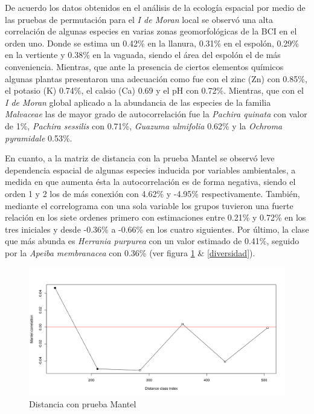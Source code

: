\documentclass[11pt,]{article}
\begin{document}
De acuerdo los datos obtenidos en el análisis de la ecología espacial
por medio de las pruebas de permutación para el \emph{I de Moran} local
se observó una alta correlación de algunas especies en varias zonas
geomorfológicas de la BCI en el orden uno. Donde se estima un 0.42\% en
la llanura, 0.31\% en el espolón, 0.29\% en la vertiente y 0.38\% en la
vaguada, siendo el área del espolón el de más conveniencia. Mientras,
que ante la presencia de ciertos elementos químicos algunas plantas
presentaron una adecuación como fue con el zinc (Zn) con 0.85\%, el
potasio (K) 0.74\%, el calsio (Ca) 0.69 y el pH con 0.72\%. Mientras,
que con el \emph{I de Moran} global aplicado a la abundancia de las
especies de la familia \emph{Malvaceae} las de mayor grado de
autocorrelación fue la \emph{Pachira quinata} con valor de 1\%,
\emph{Pachira sessilis} con 0.71\%, \emph{Guazuma ulmifolia} 0.62\% y la
\emph{Ochroma pyramidale} 0.53\%.

En cuanto, a la matriz de distancia con la prueba Mantel se observó leve
dependencia espacial de algunas especies inducida por variables
ambientales, a medida en que aumenta ésta la autocorrelación es de forma
negativa, siendo el orden 1 y 2 los de más conexión con 4.62\% y -4.95\%
respectivamente. También, mediante el correlograma con una sola variable
los grupos tuvieron una fuerte relación en los siete ordenes primero con
estimaciones entre 0.21\% y 0.72\% en los tres iniciales y desde -0.36\%
a -0.66\% en los cuatro siguientes. Por último, la clase que más abunda
es \emph{Herrania purpurea} con un valor estimado de 0.41\%, seguido por
la \emph{Apeiba membranacea} con 0.36\% (ver figura \ref{distancia} \&
\ref{diversidad}).

\begin{figure}
\centering
\includegraphics[width=1.00000\textwidth]{ecologia_espacial_files/figure-markdown_github/unnamed-chunk-14-1.png}
\caption{Distancia con prueba Mantel\label{distancia}}
\end{figure}
\end{document}
